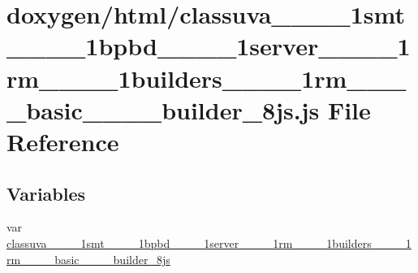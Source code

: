 \hypertarget{classuva____1____1smt____1____1bpbd____1____1server____1____1rm____1____1builders____1____1rm___4dbc6368bfaa85ceebe1162cda98f883}{}\section{doxygen/html/classuva\+\_\+\+\_\+\_\+\+\_\+1smt\+\_\+\+\_\+\_\+\+\_\+1bpbd\+\_\+\+\_\+\_\+\+\_\+1server\+\_\+\+\_\+\_\+\+\_\+1rm\+\_\+\+\_\+\_\+\+\_\+1builders\+\_\+\+\_\+\_\+\+\_\+1rm\+\_\+\+\_\+\+\_\+\+\_\+basic\+\_\+\+\_\+\+\_\+\+\_\+builder\+\_\+8js.js File Reference}
\label{classuva____1____1smt____1____1bpbd____1____1server____1____1rm____1____1builders____1____1rm___4dbc6368bfaa85ceebe1162cda98f883}
\subsection*{Variables}
\begin{DoxyCompactItemize}
\item 
var \hyperlink{classuva____1____1smt____1____1bpbd____1____1server____1____1rm____1____1builders____1____1rm___4dbc6368bfaa85ceebe1162cda98f883_a62ae1bd24a7c16bb1da25320704df676}{classuva\+\_\+\+\_\+\_\+\+\_\+1smt\+\_\+\+\_\+\_\+\+\_\+1bpbd\+\_\+\+\_\+\_\+\+\_\+1server\+\_\+\+\_\+\_\+\+\_\+1rm\+\_\+\+\_\+\_\+\+\_\+1builders\+\_\+\+\_\+\_\+\+\_\+1rm\+\_\+\+\_\+\+\_\+\+\_\+basic\+\_\+\+\_\+\+\_\+\+\_\+builder\+\_\+8js}
\end{DoxyCompactItemize}


